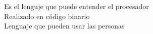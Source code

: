 \documentclass[preview]{standalone}
\begin{document}
Es el lenguje que puede entender el procesador\\Realizado en código binario\\Lenguaje que pueden usar las personas\\
\end{document}
